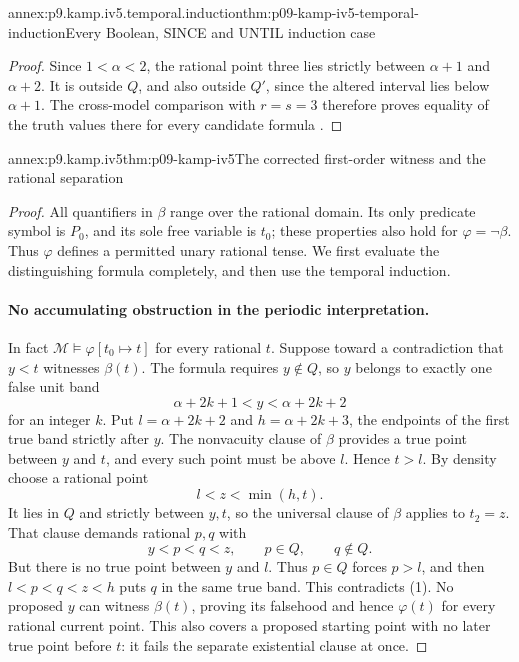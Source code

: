 \begin{annexitem}{annex:p9.kamp.iv5.temporal.induction}{thm:p09-kamp-iv5-temporal-induction}{Every Boolean, SINCE and UNTIL induction case}
\begin{proof}
Since \(1<\alpha<2\), the rational point three
lies strictly between \(\alpha+1\) and
\(\alpha+2\). It is outside \(Q\), and also
outside \(Q'\), since the altered interval lies
below \(\alpha+1\). The cross-model comparison
with \(r=s=3\) therefore proves equality of
the truth values there for every candidate formula
\cite[ch.~IV, thm.~5 proof, pp.~110--112]{Kamp1968}.
\end{proof}
\end{annexitem}

\begin{annexitem}{annex:p9.kamp.iv5}{thm:p09-kamp-iv5}{The corrected first-order witness and the rational separation}
\begin{proof}
All quantifiers in \(\beta\) range over the rational
domain. Its only predicate symbol is \(P_0\), and
its sole free variable is \(t_0\); these properties
also hold for \(\varphi=\neg\beta\). Thus
\(\varphi\) defines a permitted unary rational
tense. We first evaluate the distinguishing formula
completely, and then use the temporal induction.

\paragraph{No accumulating obstruction in the periodic interpretation.}
In fact \(\mathcal M\models\varphi[t_0\mapsto t]\) for
every rational \(t\). Suppose toward a contradiction
that \(y<t\) witnesses \(\beta(t)\). The formula
requires \(y\notin Q\), so \(y\) belongs to
exactly one false unit band
\[
                  \alpha+2k+1<y<\alpha+2k+2
\]
for an integer \(k\). Put
\(l=\alpha+2k+2\) and \(h=\alpha+2k+3\),
the endpoints of the first true band strictly after
\(y\). The nonvacuity clause of \(\beta\)
provides a true point between \(y\) and \(t\),
and every such point must be above \(l\). Hence
\(t>l\). By density choose a rational point
\[
                            l<z<\min(h,t).
\]
It lies in \(Q\) and strictly between \(y,t\),
so the universal clause of \(\beta\) applies to
\(t_2=z\). That clause demands rational
\(p,q\) with
\[
                   y<p<q<z,\qquad p\in Q,
                                      \qquad q\notin Q.
 \tag{1}
\]
But there is no true point between \(y\) and
\(l\). Thus \(p\in Q\) forces \(p>l\),
and then \(l<p<q<z<h\) puts \(q\) in the
same true band. This contradicts (1). No proposed
\(y\) can witness \(\beta(t)\), proving its
falsehood and hence \(\varphi(t)\) for every
rational current point. This also covers a proposed
starting point with no later true point before \(t\):
it fails the separate existential clause at once.


\end{proof}
\end{annexitem}
